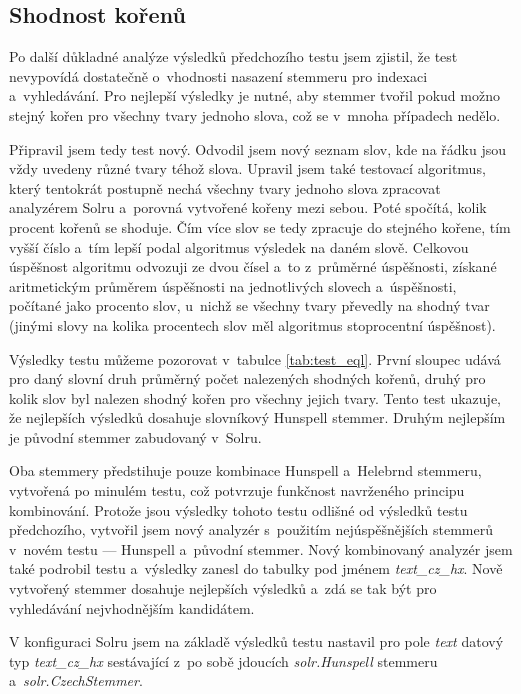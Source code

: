 \subsection{Shodnost kořenů}
Po další důkladné analýze výsledků předchozího testu jsem zjistil, že test nevypovídá dostatečně o~vhodnosti nasazení stemmeru pro indexaci a~vyhledávání. Pro nejlepší výsledky je nutné, aby stemmer tvořil pokud možno stejný kořen pro všechny tvary jednoho slova, což se v~mnoha případech nedělo.

Připravil jsem tedy test nový. Odvodil jsem nový seznam slov, kde na řádku jsou vždy uvedeny různé tvary téhož slova. Upravil jsem také testovací algoritmus, který tentokrát postupně nechá všechny tvary jednoho slova zpracovat analyzérem Solru a~porovná vytvořené kořeny mezi sebou. Poté spočítá, kolik procent kořenů se shoduje. Čím více slov se tedy zpracuje do stejného kořene, tím vyšší číslo a~tím lepší podal algoritmus výsledek na daném slově. Celkovou úspěšnost algoritmu odvozuji ze dvou čísel a~to z~průměrné úspěšnosti, získané aritmetickým průměrem úspěšnosti na jednotlivých slovech a~úspěšnosti, počítané jako procento slov, u~nichž se všechny tvary převedly na shodný tvar (jinými slovy na kolika procentech slov měl algoritmus stoprocentní úspěšnost).

Výsledky testu můžeme pozorovat v~tabulce \ref{tab:test_eql}. První sloupec udává pro daný slovní druh průměrný počet nalezených shodných kořenů, druhý pro kolik slov byl nalezen shodný kořen pro všechny jejich tvary. Tento test ukazuje, že nejlepších výsledků dosahuje slovníkový Hunspell stemmer. Druhým nejlepším je původní stemmer zabudovaný v~Solru.

Oba stemmery předstihuje pouze kombinace Hunspell a~Helebrnd stemmeru, vytvořená po minulém testu, což potvrzuje funkčnost navrženého principu kombinování. Protože jsou výsledky tohoto testu odlišné od výsledků testu předchozího, vytvořil jsem nový analyzér s~použitím nejúspěšnějších stemmerů v~novém testu --- Hunspell a~původní stemmer. Nový kombinovaný analyzér jsem také podrobil testu a~výsledky zanesl do tabulky pod jménem \emph{text\_cz\_hx}. Nově vytvořený stemmer dosahuje nejlepších výsledků a~zdá se tak být pro vyhledávání nejvhodnějším kandidátem.

V konfiguraci Solru jsem na základě výsledků testu nastavil pro pole \emph{text} datový typ \emph{text\_cz\_hx} sestávající z~po sobě jdoucích \emph{solr.Hunspell} stemmeru a~\emph{solr.CzechStemmer}.

